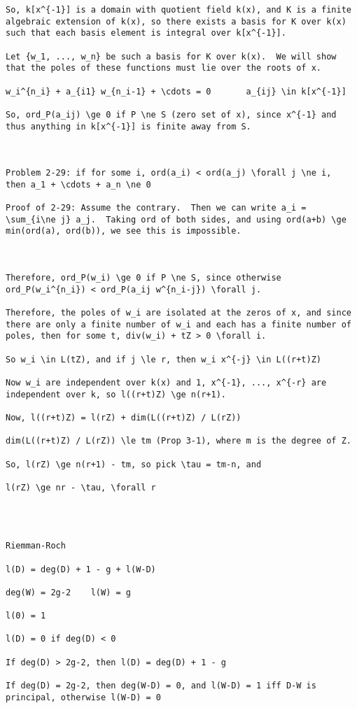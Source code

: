 \begin{verbatim}
So, k[x^{-1}] is a domain with quotient field k(x), and K is a finite
algebraic extension of k(x), so there exists a basis for K over k(x)
such that each basis element is integral over k[x^{-1}].

Let {w_1, ..., w_n} be such a basis for K over k(x).  We will show
that the poles of these functions must lie over the roots of x.

w_i^{n_i} + a_{i1} w_{n_i-1} + \cdots = 0       a_{ij} \in k[x^{-1}]

So, ord_P(a_ij) \ge 0 if P \ne S (zero set of x), since x^{-1} and
thus anything in k[x^{-1}] is finite away from S.



Problem 2-29: if for some i, ord(a_i) < ord(a_j) \forall j \ne i,
then a_1 + \cdots + a_n \ne 0

Proof of 2-29: Assume the contrary.  Then we can write a_i =
\sum_{i\ne j} a_j.  Taking ord of both sides, and using ord(a+b) \ge
min(ord(a), ord(b)), we see this is impossible.



Therefore, ord_P(w_i) \ge 0 if P \ne S, since otherwise
ord_P(w_i^{n_i}) < ord_P(a_ij w^{n_i-j}) \forall j.

Therefore, the poles of w_i are isolated at the zeros of x, and since
there are only a finite number of w_i and each has a finite number of
poles, then for some t, div(w_i) + tZ > 0 \forall i.

So w_i \in L(tZ), and if j \le r, then w_i x^{-j} \in L((r+t)Z)

Now w_i are independent over k(x) and 1, x^{-1}, ..., x^{-r} are
independent over k, so l((r+t)Z) \ge n(r+1).

Now, l((r+t)Z) = l(rZ) + dim(L((r+t)Z) / L(rZ))

dim(L((r+t)Z) / L(rZ)) \le tm (Prop 3-1), where m is the degree of Z.

So, l(rZ) \ge n(r+1) - tm, so pick \tau = tm-n, and

l(rZ) \ge nr - \tau, \forall r




Riemman-Roch

l(D) = deg(D) + 1 - g + l(W-D)

deg(W) = 2g-2    l(W) = g

l(0) = 1

l(D) = 0 if deg(D) < 0

If deg(D) > 2g-2, then l(D) = deg(D) + 1 - g

If deg(D) = 2g-2, then deg(W-D) = 0, and l(W-D) = 1 iff D-W is principal, otherwise l(W-D) = 0


\end{verbatim}
